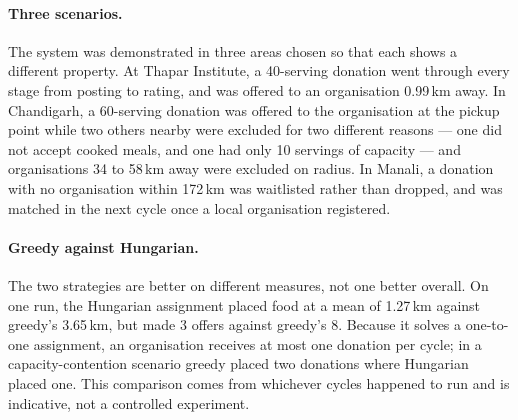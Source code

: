 \documentclass[11pt,a4paper]{report}
\begin{document}
\paragraph{Three scenarios.} The system was demonstrated in three areas chosen so
that each shows a different property. At Thapar Institute, a 40-serving donation
went through every stage from posting to rating, and was offered to an
organisation 0.99\,km away. In Chandigarh, a 60-serving donation was offered to
the organisation at the pickup point while two others nearby were excluded for
two different reasons --- one did not accept cooked meals, and one had only 10
servings of capacity --- and organisations 34 to 58\,km away were excluded on
radius. In Manali, a donation with no organisation within 172\,km was waitlisted
rather than dropped, and was matched in the next cycle once a local organisation
registered.

\paragraph{Greedy against Hungarian.} The two strategies are better on different
measures, not one better overall. On one run, the Hungarian assignment placed food
at a mean of 1.27\,km against greedy's 3.65\,km, but made 3 offers against
greedy's 8. Because it solves a one-to-one assignment, an organisation receives
at most one donation per cycle; in a capacity-contention scenario greedy placed
two donations where Hungarian placed one. This comparison comes from whichever
cycles happened to run and is indicative, not a controlled experiment.
\end{document}

